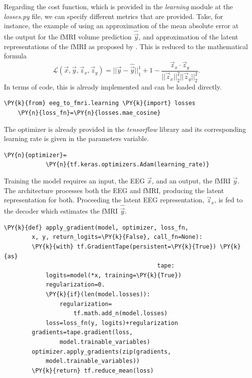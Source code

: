 Regarding the cost function, which is provided in the \textit{learning} module at the \textit{losses.py} file, we can specify different metrics that are provided. Take, for instance, the example of using an approximation of the mean absolute error at the output for the fMRI volume prediction $\hat{\vec{y}}$, and approximation of the latent representations of the fMRI as proposed by \cite{calhas2022eeg}. This is reduced to the mathematical formula
\begin{equation}\label{equation:loss}
    \mathcal{L}(\vec{x}, \vec{y}, \vec{z}_x, \vec{z}_y) = ||\vec{y} - \hat{\vec{y}}||_1^1 + 1 - \frac{\vec{z}_x \cdot \vec{z}_y}{||\vec{z}_x||_2^2 ||\vec{z}_y||_2^2}.
\end{equation}
In terms of code, this is already implemented and can be loaded directly.
\begin{Verbatim}[commandchars=\\\{\},fontsize=\footnotesize]
    \PY{k}{from} eeg_to_fmri.learning \PY{k}{import} losses
    \PY{n}{loss_fn}=\PY{n}{losses.mae_cosine}
\end{Verbatim}
The optimizer is already provided in the \textit{tensorflow} library and its corresponding learning rate is given in the parameters variable.
\begin{Verbatim}[commandchars=\\\{\},fontsize=\footnotesize]
    \PY{n}{optimizer}=
            \PY{n}{tf.keras.optimizers.Adam(learning_rate)}
\end{Verbatim}
Training the model requires an input, the EEG $\vec{x}$, and an output, the fMRI $\vec{y}$. The architecture processes both the EEG and fMRI, producing the latent representation for both. Proceeding the latent EEG representation, $\vec{z}_x$, is fed to the decoder which estimates the fMRI $\hat{\vec{y}}$.
\begin{Verbatim}[commandchars=\\\{\},fontsize=\footnotesize]
    \PY{k}{def} apply_gradient(model, optimizer, loss_fn, 
        x, y, return_logits=\PY{k}{False}, call_fn=None):
        \PY{k}{with} tf.GradientTape(persistent=\PY{k}{True}) \PY{k}{as}
                                            tape:
            logits=model(*x, training=\PY{k}{True})
            regularization=0.
            \PY{k}{if}(len(model.losses)):
                regularization=
                    tf.math.add_n(model.losses)
            loss=loss_fn(y, logits)+regularization
        gradients=tape.gradient(loss, 
                model.trainable_variables)
        optimizer.apply_gradients(zip(gradients,
            model.trainable_variables))
        \PY{k}{return} tf.reduce_mean(loss)
\end{Verbatim}
